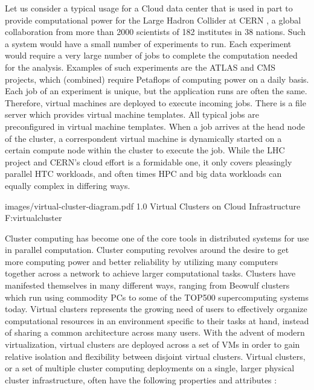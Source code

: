 Let us consider a typical usage for a Cloud data center that is used in part to provide computational power for the Large Hadron Collider at CERN \cite{CERN2003}, a global collaboration from more than 2000 scientists of 182 institutes in 38 nations.  Such a system would have a small number of experiments to run. Each experiment would require a very large number of jobs to complete the computation needed for the analysis.  Examples of such experiments are the ATLAS \cite{luo2005gsp} and CMS \cite{cms} projects, which (combined) require Petaflops of computing power on a daily basis.  Each job of an experiment is unique, but the application runs are often the same.  Therefore, virtual machines are deployed to execute incoming jobs. There is a file server which provides virtual machine templates. All typical jobs are preconfigured in virtual machine templates. When a job arrives at the head node of the  cluster, a correspondent virtual machine is dynamically started on a certain compute node within the cluster to execute the job.  While the LHC project and CERN's cloud effort is a formidable one, it only covers pleasingly parallel HTC workloads, and often times HPC and big data workloads can equally complex in differing ways.


  {images/virtual-cluster-diagram.pdf}
  {1.0}
  {Virtual Clusters on Cloud Infrastructure}
  {F:virtualcluster}


Cluster computing has become one of the core tools in distributed systems for use in parallel computation.%
Cluster computing revolves around the desire to get more computing power and better reliability by utilizing many computers together across a network to achieve larger computational tasks. Clusters have manifested themselves in many different ways, ranging from Beowulf clusters \cite{sterling2001beowulf} which run using commodity PCs to some of the TOP500 \cite{www-top500} supercomputing systems today.  Virtual clusters represents the growing need of users to effectively organize computational resources in an environment specific to their tasks at hand, instead of sharing a common architecture across many users. With the advent of modern virtualization, virtual clusters are deployed across a set of VMs in order to gain relative isolation and flexibility between disjoint virtual clusters. Virtual clusters, or a set of multiple cluster computing deployments on a single, larger physical cluster infrastructure, often have the following properties and attributes \cite{hwang2013distributed}:


